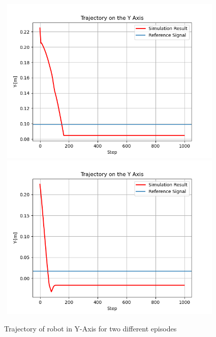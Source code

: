 \documentclass[12pt,twoside,a4]{mwbk}
\begin{document}
\begin{figure}[h!]
    \centering
    \includegraphics[width=11cm, height=8cm]{traj_y_2.png}
    \includegraphics[width=11cm, height=8cm]{traj_y.png}
    \caption{Trajectory of robot in Y-Axis for two different episodes}
\end{figure}
\newpage
\end{document}
